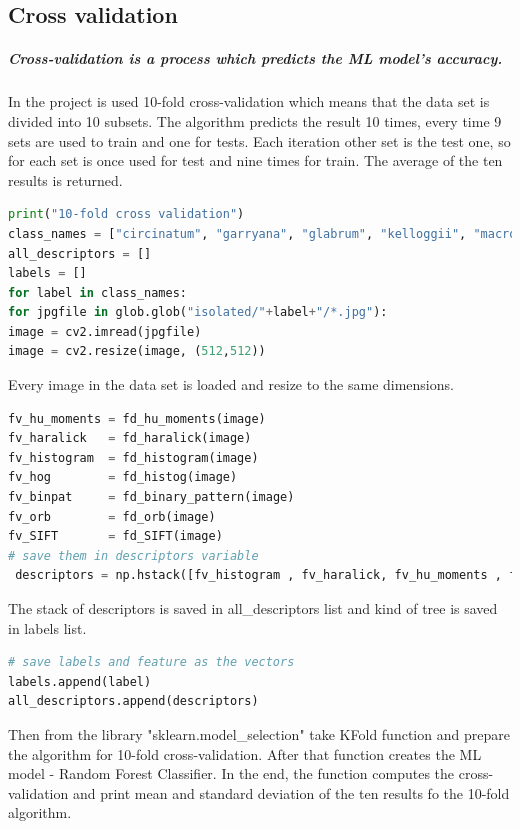 \documentclass[12pt]{article}
\begin{document}
\newpage

\subsection{Cross validation}

\subparagraph{Cross-validation is a process which predicts the ML model's accuracy.}

In the project is used 10-fold cross-validation which means that the data set is divided into 10 subsets. The algorithm predicts the result 10 times, every time 9 sets are used to train and one for tests. Each iteration other set is the test one, so for each set is once used for test and nine times for train. The average of the ten results is returned.

\begin{lstlisting}[language=Python]
print("10-fold cross validation")
class_names = ["circinatum", "garryana", "glabrum", "kelloggii", "macrophyllum","negundo"]
all_descriptors = []
labels = []
for label in class_names:
for jpgfile in glob.glob("isolated/"+label+"/*.jpg"):
image = cv2.imread(jpgfile)
image = cv2.resize(image, (512,512))
\end{lstlisting}

Every image in the data set is loaded and resize to the same dimensions.

\begin{lstlisting}[language=Python]
fv_hu_moments = fd_hu_moments(image)
fv_haralick   = fd_haralick(image)
fv_histogram  = fd_histogram(image)
fv_hog        = fd_histog(image)
fv_binpat     = fd_binary_pattern(image)
fv_orb        = fd_orb(image)
fv_SIFT       = fd_SIFT(image)
# save them in descriptors variable
 descriptors = np.hstack([fv_histogram , fv_haralick, fv_hu_moments , fv_hog , fv_binpat, fv_orb])
\end{lstlisting}

The stack of descriptors is saved in all\_descriptors list and kind of tree is saved in labels list.

\begin{lstlisting}[language=Python]
# save labels and feature as the vectors
labels.append(label)
all_descriptors.append(descriptors)
\end{lstlisting}

Then from the library "sklearn.model\_selection" take KFold function and prepare the algorithm for 10-fold cross-validation.
After that function creates the ML model - Random Forest Classifier. In the end, the function computes the cross-validation and print mean and standard deviation of the ten results fo the 10-fold algorithm.
\end{document}
